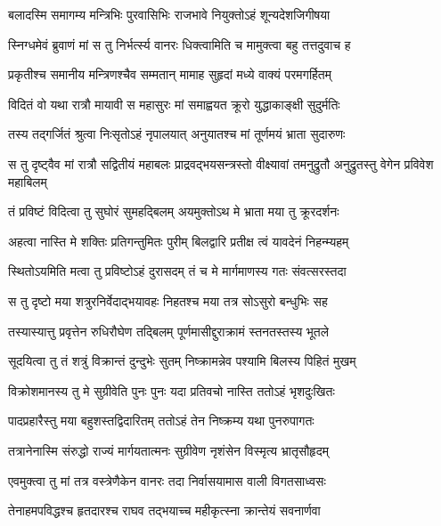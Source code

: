 \twolineshloka
{बलादस्मि समागम्य मन्त्रिभिः पुरवासिभिः}
{राजभावे नियुक्तोऽहं शून्यदेशजिगीषया} %

\twolineshloka
{स्निग्धमेवं ब्रुवाणं मां स तु निर्भर्त्स्य वानरः}
{धिक्त्वामिति च मामुक्त्वा बहु तत्तदुवाच ह} %

\twolineshloka
{प्रकृतीश्च समानीय मन्त्रिणश्चैव सम्मतान्}
{मामाह सुहृदां मध्ये वाक्यं परमगर्हितम्} %

\twolineshloka
{विदितं वो यथा रात्रौ मायावी स महासुरः}
{मां समाह्वयत क्रूरो युद्धाकाङ्क्षी सुदुर्मतिः} %

\twolineshloka
{तस्य तद्गर्जितं श्रुत्वा निःसृतोऽहं नृपालयात्}
{अनुयातश्च मां तूर्णमयं भ्राता सुदारुणः} %

\threelineshloka
{स तु दृष्ट्वैव मां रात्रौ सद्वितीयं महाबलः}
{प्राद्रवद्भयसन्त्रस्तो वीक्ष्यावां तमनुद्रुतौ}
{अनुद्रुतस्तु वेगेन प्रविवेश महाबिलम्} %

\twolineshloka
{तं प्रविष्टं विदित्वा तु सुघोरं सुमहद्बिलम्}
{अयमुक्तोऽथ मे भ्राता मया तु क्रूरदर्शनः} %

\twolineshloka
{अहत्वा नास्ति मे शक्तिः प्रतिगन्तुमितः पुरीम्}
{बिलद्वारि प्रतीक्ष त्वं यावदेनं निहन्म्यहम्} %

\twolineshloka
{स्थितोऽयमिति मत्वा तु प्रविष्टोऽहं दुरासदम्}
{तं च मे मार्गमाणस्य गतः संवत्सरस्तदा} %

\twolineshloka
{स तु दृष्टो मया शत्रुरनिर्वेदाद्भयावहः}
{निहतश्च मया तत्र सोऽसुरो बन्धुभिः सह} %

\twolineshloka
{तस्यास्यात्तु प्रवृत्तेन रुधिरौघेण तद्बिलम्}
{पूर्णमासीद्दुराक्रामं स्तनतस्तस्य भूतले} %

\twolineshloka
{सूदयित्वा तु तं शत्रुं विक्रान्तं दुन्दुभेः सुतम्}
{निष्क्रामन्नेव पश्यामि बिलस्य पिहितं मुखम्} %

\twolineshloka
{विक्रोशमानस्य तु मे सुग्रीवेति पुनः पुनः}
{यदा प्रतिवचो नास्ति ततोऽहं भृशदुःखितः} %

\twolineshloka
{पादप्रहारैस्तु मया बहुशस्तद्विदारितम्}
{ततोऽहं तेन निष्क्रम्य यथा पुनरुपागतः} %

\twolineshloka
{तत्रानेनास्मि संरुद्धो राज्यं मार्गयतात्मनः}
{सुग्रीवेण नृशंसेन विस्मृत्य भ्रातृसौहृदम्} %

\twolineshloka
{एवमुक्त्वा तु मां तत्र वस्त्रेणैकेन वानरः}
{तदा निर्वासयामास वाली विगतसाध्वसः} %

\twolineshloka
{तेनाहमपविद्धश्च हृतदारश्च राघव}
{तद्भयाच्च महीकृत्स्ना क्रान्तेयं सवनार्णवा} %

